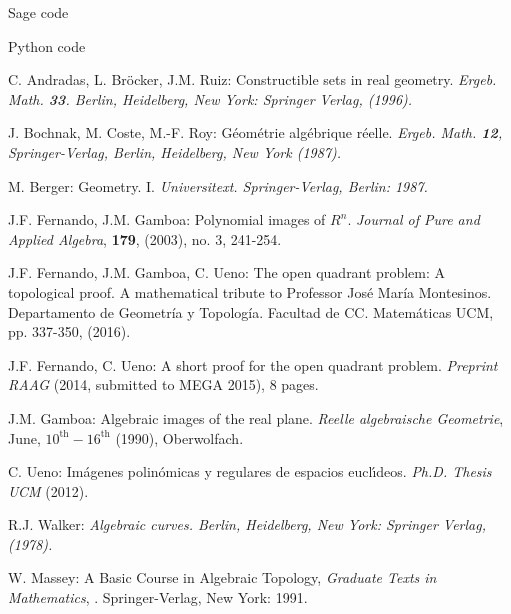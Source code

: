 \documentclass[11pt, a4paper, english, twoside, notitlepage, openright]{report}
\begin{document}
\begin{chapter}{Sage code}

\end{chapter}

\begin{chapter}{Python code}

\end{chapter}

\begin{thebibliography}{ABR}

 C. Andradas, L. Br\"ocker, J.M. Ruiz: Constructible 
sets in real geometry. \em Ergeb. Math. \em{\bf 33}. Berlin, Heidelberg, 
New York: Springer Verlag, (1996).

 J. Bochnak, M. Coste, M.-F. Roy: G\'eom\'etrie
alg\'ebrique r\'eelle. \em Ergeb. Math. \em {\bf 12}, Springer-Verlag,
Berlin, Heidelberg, New York (1987).

 M. Berger: Geometry. I. \em Universitext\em. Springer-Verlag, Berlin: 1987.

 J.F. Fernando, J.M. Gamboa: Polynomial images of $R^n$.
\textit{Journal of Pure and Applied Algebra}, {\bf 179}, (2003), no. 3, 241-254.

 J.F. Fernando, J.M. Gamboa, C. Ueno: The open quadrant problem:
A topological proof.  A mathematical tribute to Professor Jos\'e Mar\'ia Montesinos. Departamento de Geometr\'ia y Topolog\'ia. Facultad de CC. Matem\'aticas UCM, pp. 337-350, (2016).

 J.F. Fernando, C. Ueno: A short proof for the open quadrant problem.
\textit{Preprint RAAG} (2014, submitted to MEGA 2015), 8 pages.

 J.M. Gamboa: Algebraic images of the real plane. \textit{Reelle algebraische Geometrie}, June,
$10^{\text{th}}-16^{\text{th}}$ (1990), Oberwolfach.

 C. Ueno: Im\'agenes polin\'omicas y regulares de espacios eucl\'\i deos. {\em Ph.D. Thesis UCM} (2012).

 R.J. Walker: \em Algebraic curves. \em Berlin, Heidelberg, 
New York: Springer Verlag, (1978).

 W. Massey: A Basic Course in Algebraic Topology, \emph{Graduate Texts in Mathematics}, \textbf{}.
Springer-Verlag, New York: 1991.



\end{thebibliography}
\end{document}
